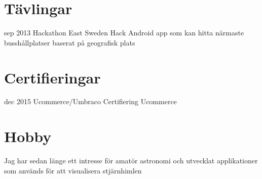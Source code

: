\documentclass[]{friggeri-cv}
\begin{document}
\section{Tävlingar}
\begin{entrylist}
  \entry
    {sep 2013}
    {Hackathon}
    {East Sweden Hack}
    {Android app som kan hitta närmaste busshållplatser baserat på geografisk plats}
\end{entrylist}

\section{Certifieringar}
\begin{entrylist}
  \entry
    {dec 2015}
    {Ucommerce/Umbraco Certifiering}
    {Ucommerce}
        {}
\end{entrylist}
\section{Hobby}
{
Jag har sedan länge ett intresse för amatör astronomi och utvecklat applikationer som används för att visualisera stjärnhimlen}
\\
\end{document}

